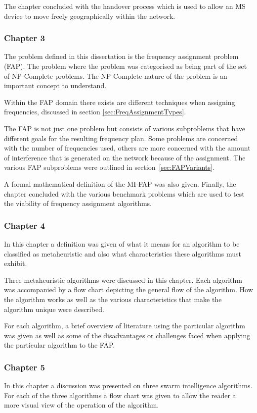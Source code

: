 The chapter concluded with the handover process which is used to allow an MS device to move freely geographically within the network. 
\subsubsection{Chapter 3}
The problem defined in this dissertation is the frequency assignment problem (FAP). The problem where the problem was categorised as being part of the set of NP-Complete problems. The NP-Complete nature of the problem is an important concept to understand.

Within the FAP domain there exists are different techniques when assigning frequencies, discussed in section \ref{sec:FreqAssignmentTypes}. 

The FAP is not just one problem but consists of various subproblems that have different goals for the resulting frequency plan. Some problems are concerned with the number of frequencies used, others are more concerned with the amount of interference that is generated on the network because of the assignment. The various FAP subproblems were outlined in section~\ref{sec:FAPVariants}.

A formal mathematical definition of the MI-FAP was also given. Finally, the chapter concluded with the various benchmark problems which are used to test the viability of frequency assignment algorithms.
\subsubsection{Chapter 4}
In this chapter a definition was given of what it means for an algorithm to be classified as metaheuristic and also what characteristics these algorithms must exhibit.

Three metaheuristic algorithms were discussed in this chapter. Each algorithm was accompanied by a flow chart depicting the general flow of the algorithm. How the algorithm works as well as the various characteristics that make the algorithm unique were described.

For each algorithm, a brief overview of literature using the particular algorithm was given as well as some of the disadvantages or challenges faced when applying the particular algorithm to the FAP.

\subsubsection{Chapter 5}
In this chapter a discussion was presented on three swarm intelligence algorithms. For each of the three algorithms a flow chart was given to allow the reader a more visual view of the operation of the algorithm. 

